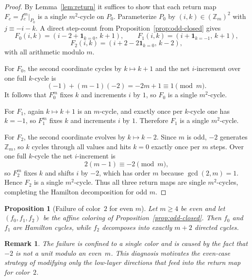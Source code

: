 \documentclass[11pt]{article}
\newtheorem{proposition}{Proposition}
\newtheorem{remark}{Remark}
\begin{document}
\begin{proof}
By Lemma~\ref{lem:return} it suffices to show that each return map $F_c=f_c^m|_{P_0}$ is a single $m^2$-cycle on $P_0$.
Parameterize $P_0$ by $(i,k)\in(\mathbb Z_m)^2$ with $j\equiv -i-k$.
A direct step-count from Proposition~\ref{prop:odd-closed} gives
\[
F_0(i,k)=(i-2+\mathbf 1_{k=0},\,k+1),\qquad
F_1(i,k)=(i+\mathbf 1_{k=-1},\,k+1),
\]
\[
F_2(i,k)=(i+2-2\mathbf 1_{k=0},\,k-2),
\]
with all arithmetic modulo $m$.

For $F_0$, the second coordinate cycles by $k\mapsto k+1$ and the net $i$-increment over one full $k$-cycle is
\[
(-1)+(m-1)(-2)=-2m+1\equiv 1\pmod m.
\]
It follows that $F_0^m$ fixes $k$ and increments $i$ by $1$, so $F_0$ is a single $m^2$-cycle.

For $F_1$, again $k\mapsto k+1$ is an $m$-cycle, and exactly once per $k$-cycle one has $k=-1$, so $F_1^m$ fixes $k$ and increments $i$ by $1$.
Therefore $F_1$ is a single $m^2$-cycle.

For $F_2$, the second coordinate evolves by $k\mapsto k-2$.
Since $m$ is odd, $-2$ generates $\mathbb Z_m$, so $k$ cycles through all values and hits $k=0$ exactly once per $m$ steps.
Over one full $k$-cycle the net $i$-increment is
\[
2(m-1)\equiv -2\pmod m,
\]
so $F_2^m$ fixes $k$ and shifts $i$ by $-2$, which has order $m$ because $\gcd(2,m)=1$.
Hence $F_2$ is a single $m^2$-cycle.
Thus all three return maps are single $m^2$-cycles, completing the Hamilton decomposition for odd $m$.
\end{proof}

\begin{proposition}[Failure of color~$2$ for even $m$]\label{prop:even-shatter}
Let $m\ge 4$ be even and let $(f_0,f_1,f_2)$ be the affine coloring of Proposition~\ref{prop:odd-closed}.
Then $f_0$ and $f_1$ are Hamilton cycles, while $f_2$ decomposes into exactly $m+2$ directed cycles.
\end{proposition}

\begin{remark}
The failure is confined to a single color and is caused by the fact that $-2$ is not a unit modulo an even~$m$.
This diagnosis motivates the even-case strategy of modifying only the low-layer directions that feed into the return map for color~$2$.
\end{remark}
\end{document}
